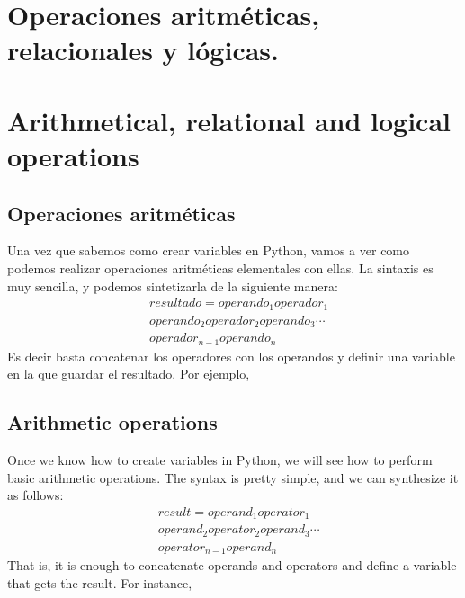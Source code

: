 \begin{paracol}{2}
\section[Operaciones aritméticas, relacionales y lógicas.]{Operaciones aritméticas, relacionales y lógicas.}
\switchcolumn
\section{Arithmetical, relational and logical operations}
\end{paracol}
\begin{paracol}{2}
\subsection{Operaciones aritméticas}
 Una vez que sabemos como crear variables en Python, vamos a ver como podemos realizar operaciones aritméticas elementales con ellas. La sintaxis es muy sencilla, y podemos sintetizarla de la siguiente manera:
\begin{equation*}
\begin{split}
&resultado=operando_1 operador_1\\
&operando_2 operador_2 operando_3 \cdots\\ 
&operador_{n-1} operando_n
\end{split}
\end{equation*}
Es decir basta concatenar los operadores con los operandos y definir una variable en la que guardar el resultado. Por ejemplo,
\switchcolumn
\subsection{Arithmetic operations}
Once we know how to create variables in Python, we will see how to perform basic arithmetic operations. The syntax is pretty simple, and we can synthesize it as follows:
\begin{equation*}
\begin{split}
&result=operand_1 operator_1\\
&operand_2 operator_2 operand_3 \cdots\\ 
&operator_{n-1} operand_n
\end{split}
\end{equation*}
That is, it is enough to concatenate operands and operators and define a variable that gets the result. For instance, 
\end{paracol}

